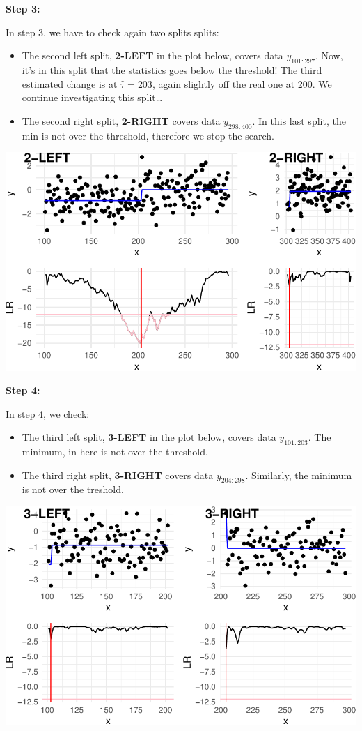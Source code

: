 \documentclass[
  letterpaper,
  DIV=11,
  numbers=noendperiod]{scrreprt}
\begin{document}
\textbf{Step 3:}

In step 3, we have to check again two splits splits:

\begin{itemize}
\item
  The second left split, \textbf{2-LEFT} in the plot below, covers data
  \(y_{101:297}\). Now, it's in this split that the statistics goes
  below the threshold! The third estimated change is at
  \(\hat\tau = 203\), again slightly off the real one at 200. We
  continue investigating this split\ldots{}
\item
  The second right split, \textbf{2-RIGHT} covers data \(y_{298:400}\).
  In this last split, the min is not over the threshold, therefore we
  stop the search.
\end{itemize}

\includegraphics{3_multiple_changes_files/figure-pdf/unnamed-chunk-10-1.pdf}

\textbf{Step 4:}

In step 4, we check:

\begin{itemize}
\item
  The third left split, \textbf{3-LEFT} in the plot below, covers data
  \(y_{101:203}\). The minimum, in here is not over the threshold.
\item
  The third right split, \textbf{3-RIGHT} covers data \(y_{204:298}\).
  Similarly, the minimum is not over the treshold.
\end{itemize}

\includegraphics{3_multiple_changes_files/figure-pdf/unnamed-chunk-11-1.pdf}
\end{document}

